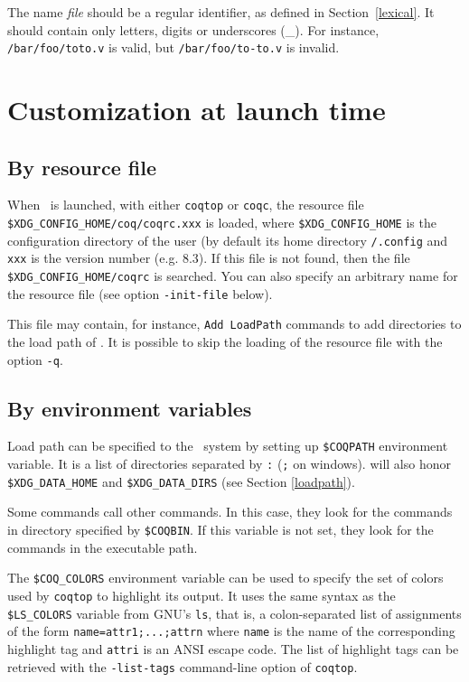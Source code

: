 \Warning The name {\em file} should be a regular {\Coq} identifier, as
defined in Section~\ref{lexical}. It should contain only letters, digits
or underscores (\_). For instance, \verb+/bar/foo/toto.v+ is valid, but
\verb+/bar/foo/to-to.v+ is invalid.

\section[Customization]{Customization at launch time}

\subsection{By resource file}

When \Coq\ is launched, with either {\tt coqtop} or {\tt coqc}, the
resource file \verb:$XDG_CONFIG_HOME/coq/coqrc.xxx: is loaded, where
\verb:$XDG_CONFIG_HOME: is the configuration directory of the user (by
default its home directory \verb!/.config! and \verb:xxx: is the version
number (e.g. 8.3).  If this file is not found, then the file
\verb:$XDG_CONFIG_HOME/coqrc: is searched. You can also specify an
arbitrary name for the resource file (see option \verb:-init-file:
below).


This file may contain, for instance, \verb:Add LoadPath: commands to add
directories to the load path of \Coq.
It is possible to skip the loading of the resource file with the
option \verb:-q:.

\subsection{By environment variables\label{EnvVariables}
\label{envars}}

Load path can be specified to the \Coq\ system by setting up
\verb:$COQPATH: environment variable. It is a list of directories
separated by \verb|:| (\verb|;| on windows). {\Coq} will also honor
\verb:$XDG_DATA_HOME: and \verb:$XDG_DATA_DIRS: (see Section
\ref{loadpath}).

Some {\Coq} commands call other {\Coq} commands. In this case, they
look for the commands in directory specified by \verb:$COQBIN:. If
this variable is not set, they look for the commands in the executable
path.

The \verb:$COQ_COLORS: environment variable can be used to specify the set of
colors used by {\tt coqtop} to highlight its output. It uses the same syntax as
the \verb:$LS_COLORS: variable from GNU's {\tt ls}, that is, a colon-separated
list of assignments of the form \verb:name=attr1;...;attrn: where {\tt name} is
the name of the corresponding highlight tag and {\tt attri} is an ANSI escape
code. The list of highlight tags can be retrieved with the {\tt -list-tags}
command-line option of {\tt coqtop}.

